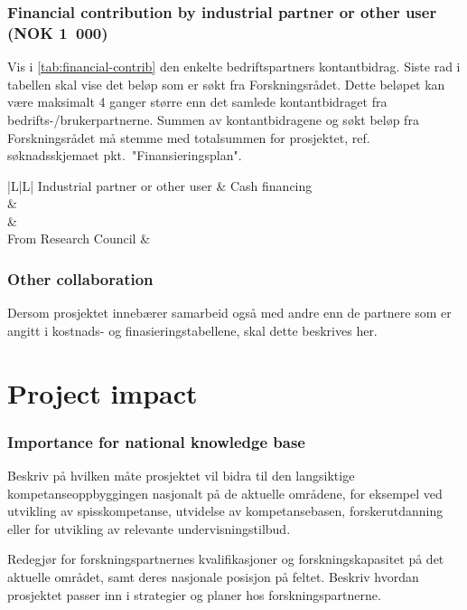 \documentclass[11pt,a4paper,british]{article}
\begin{document}
\section{Financial contribution by industrial partner or other user (NOK 1 000)}
Vis i \cref{tab:financial-contrib} den enkelte bedriftspartners kontantbidrag.
Siste rad i tabellen skal vise det beløp som er søkt fra Forskningsrådet.
Dette beløpet kan være maksimalt 4 ganger større enn det samlede kontantbidraget fra bedrifts-/brukerpartnerne.
Summen av kontantbidragene og søkt beløp fra Forskningsrådet må stemme med totalsummen for prosjektet, ref. søknadsskjemaet pkt.~"Finansieringsplan".

\begin{table}
	\centering
	\begin{tabulary}{\textwidth}{|L|L|}
		\hline
		Industrial partner or other user & Cash financing \\ \hline
		                                 &                \\ \hline
		                                 &                \\ \hline
		From Research Council            &                \\ \hline
	\end{tabulary}
	\caption{Financial contributions\label{tab:financial-contrib}}
\end{table}

\section{Other collaboration}
Dersom prosjektet innebærer samarbeid også med andre enn de partnere som er angitt i kostnads- og finasieringstabellene, skal dette beskrives her.

\part{Project impact}

\section{Importance for national knowledge base}
Beskriv på hvilken måte prosjektet vil bidra til den langsiktige kompetanseoppbyggingen nasjonalt på de aktuelle områdene, for eksempel ved utvikling av spisskompetanse, utvidelse av kompetansebasen, forskerutdanning eller for utvikling av relevante undervisningstilbud.

Redegjør for forskningspartnernes kvalifikasjoner og forskningskapasitet på det aktuelle området, samt deres nasjonale posisjon på feltet.
Beskriv hvordan prosjektet passer inn i strategier og planer hos forskningspartnerne.
\end{document}
